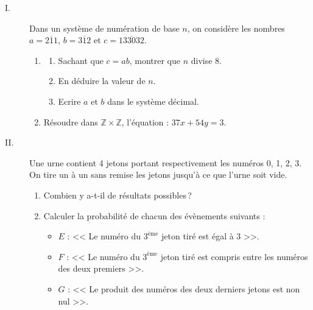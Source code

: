       \begin{description}
            \item[I. ]
                  Dans un syst\`eme de num\'eration de base $n$, on consid\`ere les nombres 
                  $a = \overline{211}$, $b = \overline{312}$ et $c = \overline{133032}$.
                  \begin{enumerate}
                        \item \begin{enumerate}
                                    \item Sachant que $c = ab$, montrer que $n$ divise $8$.
                                    \item En d\'eduire la valeur de $n$.
                                    \item Ecrire $a$ et $b$ dans le syst\`eme d\'ecimal.
                              \end{enumerate}
                        \item R\'esoudre dans $\mathbb{Z} \times \mathbb{Z}$, l'\'equation : $37 x + 54 y = 3$.
                  \end{enumerate}
            \item[II. ]
                  Une urne contient 4 jetons portant respectivement les num\'eros 0, 1, 2, 3.
                  On tire un \`a un sans remise les jetons jusqu'\`a ce que l'urne soit vide.
                  \begin{enumerate}
                        \item Combien y a-t-il de r\'esultats possibles\,?
                        \item Calculer la probabilit\'e de chacun des \'ev\`enements suivants : 
                              \begin{itemize}
                                    \item $E$ : << Le num\'ero du $3^{\text{\`eme}}$ jeton tir\'e est \'egal \`a 3 >>.
                                    \item $F$ : << Le num\'ero du $3^{\text{\`eme}}$ jeton tir\'e est compris entre les 
                                          num\'eros des deux premiers >>.
                                    \item $G$ : << Le produit des num\'eros des deux derniers jetons est non nul >>.
                              \end{itemize}
                  \end{enumerate}
      \end{description}
